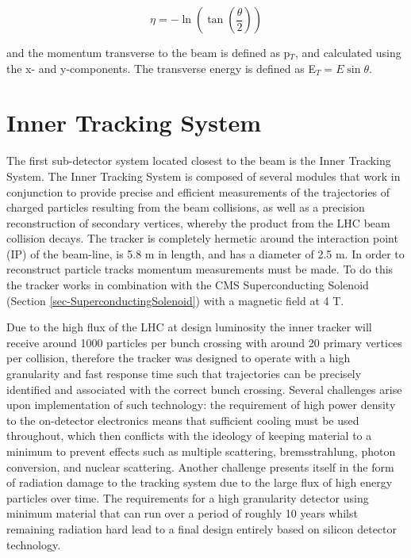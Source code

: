 \begin{equation}
\eta = -\ln \left(\tan\left(\frac{\theta}{2}\right)\right)
\end{equation}

and the momentum transverse to the beam is defined as p$_T$, and calculated using the x- and y-components. The transverse energy is defined as E$_T = E\sin\theta$. 

\section{Inner Tracking System} \label{sec-InnerTrackingSystem}

The first sub-detector system located closest to the beam is the Inner Tracking System. The Inner Tracking System is composed of several modules that work in conjunction to provide precise and efficient measurements of the trajectories of charged particles resulting from the beam collisions, as well as a precision reconstruction of secondary vertices, whereby the product from the LHC beam collision decays. The tracker is completely hermetic around the interaction point (IP) of the beam-line, is 5.8 m in length, and has a diameter of 2.5 m. In order to reconstruct particle tracks momentum measurements must be made. To do this the tracker works in combination with the CMS Superconducting Solenoid (Section \ref{sec-SuperconductingSolenoid}) with a magnetic field at 4 T. 

Due to the high flux of the LHC at design luminosity the inner tracker will receive around 1000 particles per bunch crossing with around 20 primary vertices per collision, therefore the tracker was designed to operate with a high granularity and fast response time such that trajectories can be precisely identified and associated with the correct bunch crossing. Several challenges arise upon implementation of such technology: the requirement of high power density to the on-detector electronics means that sufficient cooling must be used throughout, which then conflicts with the ideology of keeping material to a minimum to prevent effects such as multiple scattering, bremsstrahlung, photon conversion, and nuclear scattering. Another challenge presents itself in the form of radiation damage to the tracking system due to the large flux of high energy particles over time. The requirements for a high granularity detector using minimum material that can run over a period of roughly 10 years whilst remaining radiation hard lead to a final design entirely based on silicon detector technology. 

